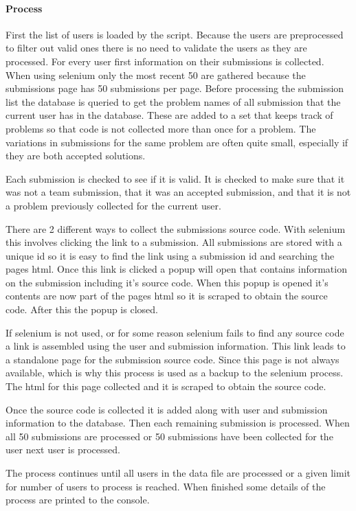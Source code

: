 \documentclass{article}
\begin{document}
\paragraph{Process}
First the list of users is loaded by the script. Because the users are preprocessed to filter out valid ones there is no need to validate the users as they are processed. For every user first information on their submissions is collected. When using selenium only the most recent 50 are gathered because the submissions page has 50 submissions per page. Before processing the submission list the database is queried to get the problem names of all submission that the current user has in the database. These are added to a set that keeps track of problems so that code is not collected more than once for a problem. The variations in submissions for the same problem are often quite small, especially if they are both accepted solutions.

Each submission is checked to see if it is valid. It is checked to make sure that it was not a team submission, that it was an accepted submission, and that it is not a problem previously collected for the current user.

There are 2 different ways to collect the submissions source code. With selenium this involves clicking the link to a submission. All submissions are stored with a unique id so it is easy to find the link using a submission id and searching the pages html. Once this link is clicked a popup will open that contains information on the submission including it's source code. When this popup is opened it's contents are now part of the pages html so it is scraped to obtain the source code. After this the popup is closed.

If selenium is not used, or for some reason selenium fails to find any source code a link is assembled using the user and submission information. This link leads to a standalone page for the submission source code. Since this page is not always available, which is why this process is used as a backup to the selenium process. The html for this page collected and it is scraped to obtain the source code.

Once the source code is collected it is added along with user and submission information to the database. Then each remaining submission is processed. When all 50 submissions are processed or 50 submissions have been collected for the user next user is processed.

The process continues until all users in the data file are processed or a given limit for number of users to process is reached. When finished some details of the process are printed to the console.
\end{document}
